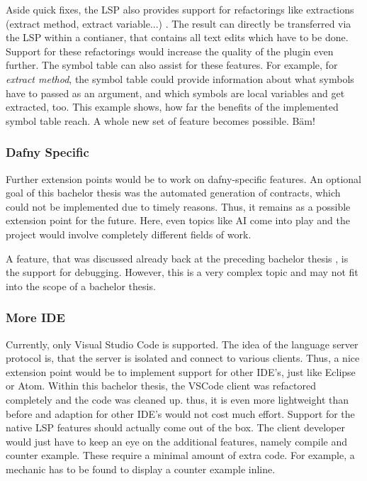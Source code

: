 Aside quick fixes, the LSP also provides support for refactorings like extractions (extract method, extract variable...) \cite{lspspec}.
The result can directly be transferred via the LSP within a  contianer, that contains all text edits which have to be done.
Support for these refactorings would increase the quality of the plugin even further.
The symbol table can also assist for these features.
For example, for \textit{extract method}, the symbol table could provide information about what symbols have to passed as an argument, and which symbols are local variables and get extracted, too.
This example shows, how far the benefits of the implemented symbol table reach.
A whole new set of feature becomes possible. Bäm! 

\subsubsection{Dafny Specific}
Further extension points would be to work on dafny-specific features.
An optional goal of this bachelor thesis was the automated generation of contracts, which could not be implemented due to timely reasons.
Thus, it remains as a possible extension point for the future.
Here, even topics like AI come into play and the project would involve completely different fields of work.

A feature, that was discussed already back at the preceding bachelor thesis \cite{ba}, is the support for debugging.
However, this is a very complex topic and may not fit into the scope of a bachelor thesis.


\subsubsection{More IDE}
Currently, only Visual Studio Code is supported.
The idea of the language server protocol is, that the server is isolated and connect to various clients.
Thus, a nice extension point would be to implement support for other IDE's, just like Eclipse or Atom.
Within this bachelor thesis, the VSCode client was refactored completely and the code was cleaned up.
thus, it is even more lightweight than before and adaption for other IDE's would not cost much effort.
Support for the native LSP features should actually come out of the box.
The client developer would just have to keep an eye on the additional features, namely compile and counter example.
These require a minimal amount of extra code. 
For example, a mechanic has to be found to display a counter example inline.






